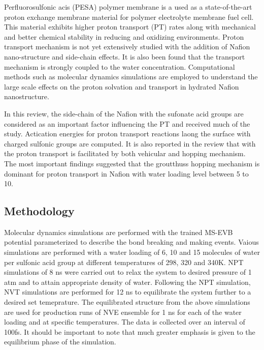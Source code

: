 \documentclass{article}
\begin{document}
Perfluorosulfonic acis (PESA) polymer membrane is a used as a state-of-the-art proton exchange membrane material for polymer electrolyte membrane fuel cell. This material exhibits higher proton transport (PT) rates along with mechanical and better chemical stability in reducing and oxidizing environments. Proton transport mechanism is not yet extensively studied with the addition of Nafion nano-structure and side-chain effects. It is also been found that the transport mechanism is strongly coupled to the water concentration. Computational methods such as molecular dynamics simulations are employed to understand the large scale effects on the proton solvation and transport in hydrated Nafion nanostructure.

In this review, the side-chain of the Nafion with the sufonate acid groups are considered as an important factor influencing the PT and received much of the study. Actication energies for proton transport reactions laong the surface with charged sulfonic groups are computed. It is also reported in the review that with the proton transport is facilitated by both vehicular and hopping mechanism. The most important findings suggested that the groutthuss hopping mechanism is dominant for proton transport in Nafion with water loading level between 5 to 10. 

\subsection{Methodology}
\label{sec-3-2}
Molecular dynamics simulations are performed with the trained MS-EVB potential parameterized to describe the bond breaking and making events. Vaious simulations are performed with a water loading of 6, 10 and 15 molecules of water per sulfonic acid group at different temperatures of 298, 320 and 340K. 
NPT simulations of 8 ns were carried out to relax the system to desired pressure of 1 atm and to attain appropriate density of water. Following the NPT simulation, NVT simulations are performed for 12 ns to equilibrate the system further to a desired set temeprature. The equilibrated structure from the above simulations are used for production runs of NVE ensemble for 1 ns for each of the water loading and at specific temperatures. The data is collected over an interval of 100fs. It should be important to note that much greater emphasis is given to the equilibrium phase of the simulation.
\end{document}
